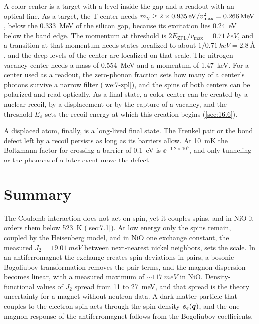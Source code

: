 A color center is a target with a level inside the gap and a readout with an optical line. As a target, the T center needs $m_{\chi} \ge 2\times\SI{0.935}{eV}/v_{\mathrm{max}}^2 = \SI{0.266}{MeV}$, below the \SI{0.333}{MeV} of the silicon gap, because its excitation lies \SI{0.24}{eV} below the band edge. The momentum at threshold is $2E_{\mathrm{ZPL}}/v_{\mathrm{max}} = \SI{0.71}{keV}$, and a transition at that momentum needs states localized to about $1/\SI{0.71}{keV} = \SI{2.8}{\angstrom}$, and the deep levels of the center are localized on that scale. The nitrogen--vacancy center needs a mass of \SI{0.554}{MeV} and a momentum of \SI{1.47}{keV}. For a center used as a readout, the zero-phonon fraction sets how many of a center's photons survive a narrow filter (\cref{we:7-zpl}), and the spins of both centers can be polarized and read optically. As a final state, a color center can be created by a nuclear recoil, by a displacement or by the capture of a vacancy, and the threshold $E_{\mathrm{d}}$ sets the recoil energy at which this creation begins (\cref{sec:16.6}).

A displaced atom, finally, is a long-lived final state. The Frenkel pair or the bond defect left by a recoil persists as long as its barriers allow. At \SI{10}{mK} the Boltzmann factor for crossing a barrier of \SI{0.1}{eV} is $\ee^{-1.2\times10^5}$, and only tunneling or the phonons of a later event move the defect.

\section*{Summary}

The Coulomb interaction does not act on spin, yet it couples spins, and in NiO it orders them below \SI{523}{K} (\cref{sec:7.1}). At low energy only the spins remain, coupled by the Heisenberg model, and in NiO one exchange constant, the measured $J_2 = \SI{19.01}{meV}$ between next-nearest nickel neighbors, sets the scale. In an antiferromagnet the exchange creates spin deviations in pairs, a bosonic Bogoliubov transformation removes the pair terms, and the magnon dispersion becomes linear, with a measured maximum of ${\sim}\SI{117}{meV}$ in NiO. Density-functional values of $J_2$ spread from 11 to \SI{27}{meV}, and that spread is the theory uncertainty for a magnet without neutron data. A dark-matter particle that couples to the electron spin acts through the spin density $\bm{s}_e(\bm{q})$, and the one-magnon response of the antiferromagnet follows from the Bogoliubov coefficients.

